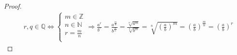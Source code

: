 \begin{proof}
    \begin{align*}
        &r, q \in \mathbb{Q} \iff
        \left\{\begin{array}{l}
            m \in \mathbb{Z} \\
            n \in \mathbb{N} \\
            r = \frac{m}{n} \\
        \end{array}\right. \Rightarrow
        \frac{a^r}{b^r} =  \frac{a^\frac{m}{n}}{b^\frac{m}{n}} = \frac{\sqrt[n]{a^m}}{\sqrt[n]{b^m}} = \sqrt[n]{\left(\frac{a}{b}\right)^m}
        =\left(\frac{a}{b}\right)^\frac{m}{n} = \left(\frac{a}{b}\right)^r
    \end{align*}
\end{proof}